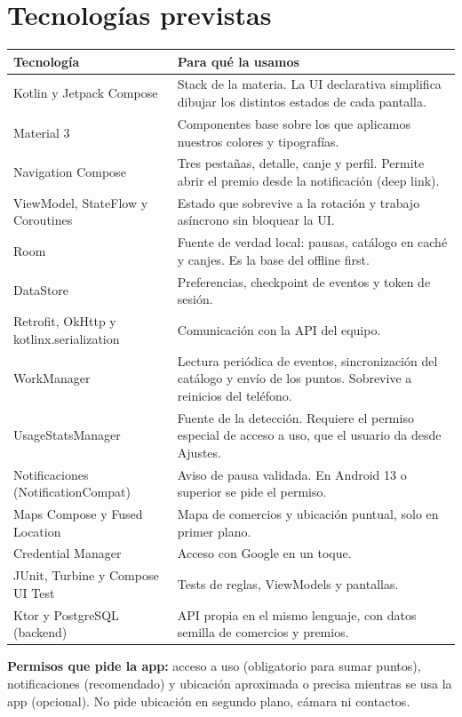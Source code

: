\section{Tecnologías previstas}
\label{sec:tecnologias}

\begin{table}[H]
\centering\small
\begin{tabularx}{\textwidth}{@{}l L@{}}
\toprule
\textbf{Tecnología} & \textbf{Para qué la usamos} \\
\midrule
Kotlin y Jetpack Compose & Stack de la materia. La UI declarativa simplifica dibujar los distintos estados de cada pantalla. \\
Material 3 & Componentes base sobre los que aplicamos nuestros colores y tipografías. \\
Navigation Compose & Tres pestañas, detalle, canje y perfil. Permite abrir el premio desde la notificación (deep link). \\
ViewModel, StateFlow y Coroutines & Estado que sobrevive a la rotación y trabajo asíncrono sin bloquear la UI. \\
Room & Fuente de verdad local: pausas, catálogo en caché y canjes. Es la base del offline first. \\
DataStore & Preferencias, checkpoint de eventos y token de sesión. \\
Retrofit, OkHttp y kotlinx.serialization & Comunicación con la API del equipo. \\
WorkManager & Lectura periódica de eventos, sincronización del catálogo y envío de los puntos. Sobrevive a reinicios del teléfono. \\
UsageStatsManager & Fuente de la detección. Requiere el permiso especial de acceso a uso, que el usuario da desde Ajustes. \\
Notificaciones (NotificationCompat) & Aviso de pausa validada. En Android 13 o superior se pide el permiso. \\
Maps Compose y Fused Location & Mapa de comercios y ubicación puntual, solo en primer plano. \\
Credential Manager & Acceso con Google en un toque. \\
JUnit, Turbine y Compose UI Test & Tests de reglas, ViewModels y pantallas. \\
Ktor y PostgreSQL (backend) & API propia en el mismo lenguaje, con datos semilla de comercios y premios. \\
\bottomrule
\end{tabularx}
\end{table}

\textbf{Permisos que pide la app:} acceso a uso (obligatorio para sumar puntos), notificaciones (recomendado) y ubicación aproximada o precisa mientras se usa la app (opcional). No pide ubicación en segundo plano, cámara ni contactos.
